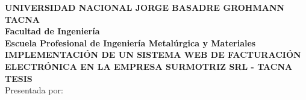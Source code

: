 \begin{titlepage}
    \begin{center}
        \LARGE{ \textbf{UNIVERSIDAD NACIONAL JORGE BASADRE GROHMANN TACNA}}\\
        \vspace{5mm}
        \large{ \textbf{Facultad de Ingeniería}} \\
        \vspace{5mm}
        \large{ \textbf{Escuela Profesional de Ingeniería Metalúrgica y Materiales}}\\
        \vspace{7mm}
        \large{}{ \textbf{IMPLEMENTACIÓN DE UN SISTEMA WEB DE FACTURACIÓN ELECTRÓNICA EN LA EMPRESA SURMOTRIZ SRL - TACNA}}\\
        \vspace{8mm}
        \LARGE{ \textbf{TESIS}}\\
        \vspace{7mm}
        \large{Presentada por:}
    \end{center}
\end{titlepage}
